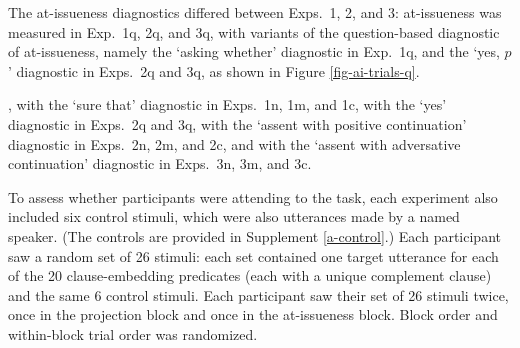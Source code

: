 \documentclass[11pt,fleqn]{article}
\newcommand{\6}{\mbox{$[\hspace*{-.6mm}[$}}
\newcommand{\9}{\mbox{$]\hspace*{-.6mm}]$}}
\begin{document}
The at-issueness diagnostics differed between Exps.~1, 2, and 3: at-issueness was measured in Exp.~1q, 2q, and 3q, with variants of the question-based diagnostic of at-issueness, namely the `asking whether' diagnostic in Exp.~1q, and the `yes, $p$' diagnostic in Exps.~2q and 3q, as shown in Figure \ref{fig-ai-trials-q}.


, with the `sure that' diagnostic in Exps.~1n, 1m, and 1c, with the `yes' diagnostic in Exps.~2q and 3q, with the `assent with positive continuation' diagnostic in Exps.~2n, 2m, and 2c,  and with the `assent with adversative continuation' diagnostic in Exps.~3n, 3m, and 3c.  


To assess whether participants were attending to the task, each experiment also included six control stimuli, which were also utterances made by a named speaker. (The controls are provided in Supplement \ref{a-control}.) Each participant saw a random set of 26 stimuli: each set contained one target utterance for each of the 20 clause-embedding predicates (each with a unique complement clause) and the same 6 control stimuli. Each participant saw their set of 26 stimuli twice, once in the projection block and once in the at-issueness block. Block order and within-block trial order was randomized. 
\end{document}
